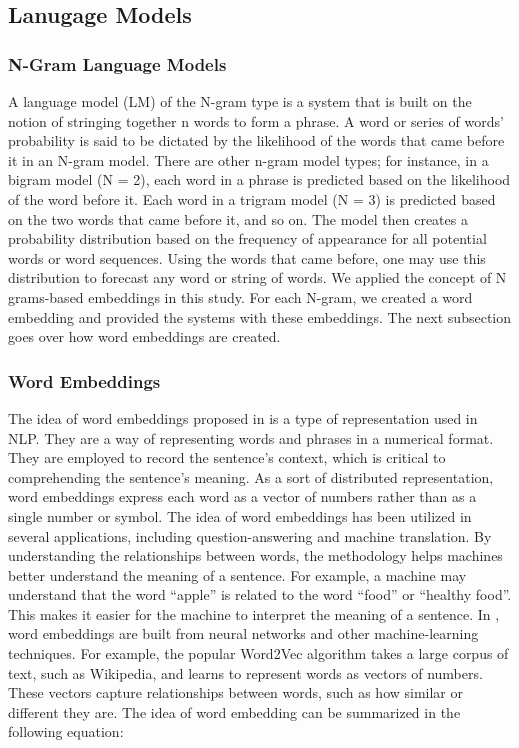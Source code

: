 \subsection{Lanugage Models}
\subsubsection{N-Gram Language Models}

A language model (LM) of the N-gram type is a system that is built on the notion of stringing together n words to form a phrase. A word or series of words' probability is said to be dictated by the likelihood of the words that came before it in an N-gram model. There are other n-gram model types; for instance, in a bigram model (N = 2), each word in a phrase is predicted based on the likelihood of the word before it. Each word in a trigram model (N = 3) is predicted based on the two words that came before it, and so on. The model then creates a probability distribution based on the frequency of appearance for all potential words or word sequences. Using the words that came before, one may use this distribution to forecast any word or string of words.
We applied the concept of N grams-based embeddings in this study. For each N-gram, we created a word embedding and provided the systems with these embeddings.
The next subsection goes over how word embeddings are created. 

\subsubsection{Word Embeddings}

The idea of word embeddings proposed in \cite{mikolov2013efficient} is a type of representation used in NLP. They are a way of representing words and phrases in a numerical format. They are employed to record the sentence's context, which is critical to comprehending the sentence's meaning.
As a sort of distributed representation, word embeddings express each word as a vector of numbers rather than as a single number or symbol.
The idea of word embeddings has been utilized in several applications, including question-answering and machine translation.  By understanding the relationships between words, the methodology helps machines better understand the meaning of a sentence. For example, a machine may understand that the word “apple” is related to the word “food” or “healthy food”. This makes it easier for the machine to interpret the meaning of a sentence. In \cite{mikolov2013efficient}, word embeddings are built from neural networks and other machine-learning techniques. For example, the popular Word2Vec algorithm takes a large corpus of text, such as Wikipedia, and learns to represent words as vectors of numbers. These vectors capture relationships between words, such as how similar or different they are. The idea of word embedding can be summarized in the following equation: 

